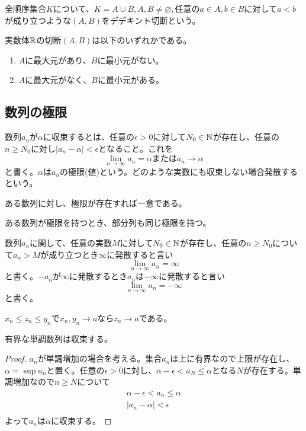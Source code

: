 	\begin{dfn}[デデキント切断]
		全順序集合$K$について、$K = A \cup B, A, B \neq \varnothing, $任意の$a \in A, b \in B$に対して$a < b$が成り立つような$(A, B)$をデデキント切断という。
	\end{dfn}

	\begin{dfn}[デデキントの公理]
		実数体$\mathbb{R}$の切断$(A, B)$は以下のいずれかである。
		\begin{enumerate}
			\item $A$に最大元があり、$B$に最小元がない。
			\item $A$に最大元がなく、$B$に最小元がある。
		\end{enumerate}
	\end{dfn}

\subsection{数列の極限}
	\begin{dfn}[極限,$\epsilon-N$論法]
		数列${a_n}$が$\alpha$に収束するとは、任意の$\epsilon > 0$に対して$N_0 \in \mathbb{N}$が存在し、任意の$n \geq N_0$に対し$|a_n - \alpha| < \epsilon$となること。これを
			\[\lim_{n \to \infty} a_n = \alpha または a_n \to \alpha\]
		と書く。$\alpha$は${a_n}$の極限(値)という。どのような実数にも収束しない場合発散するという。
	\end{dfn}
	\begin{prop}[極限の一意性]
		ある数列に対し、極限が存在すれば一意である。
	\end{prop}
	\begin{prop}
		ある数列が極限を持つとき、部分列も同じ極限を持つ。
	\end{prop}
	\begin{dfn}
		数列${a_n}$に関して、任意の実数$M$に対して$N_0 \in \mathbb{N}$が存在し、任意の$n \geq N_0$について$a_n > M$が成り立つとき$\infty$に発散すると言い
			\[\lim_{n \to \infty} a_n = \infty\]
		と書く。${-a_n}$が$\infty$に発散するとき${a_n}$は$-\infty$に発散すると言い
			\[\lim_{n \to \infty} a_n = -\infty\]
		と書く。
	\end{dfn}

	\begin{thm}[はさみうちの原理]
		$x_n \leq z_n \leq y_n$で$x_n, y_n \to a$なら$z_n \to a$である。
	\end{thm}

	\begin{thm}[有界単調数列の収束定理]
		有界な単調数列は収束する。
	\end{thm}
	\begin{proof}
		${a_n}$が単調増加の場合を考える。集合${a_n}$は上に有界なので上限が存在し、$\alpha = \sup{a_n}$と置く。任意の$\epsilon > 0$に対し、$\alpha - \epsilon < a_N \leq \alpha$となる$N$が存在する。単調増加なので$n \geq N$について
		\begin{align*}
			\alpha - \epsilon < a_n \leq \alpha\\
			|a_n - \alpha| < \epsilon\\
		\end{align*}
		よって${a_n}$は$\alpha$に収束する。
	\end{proof}

